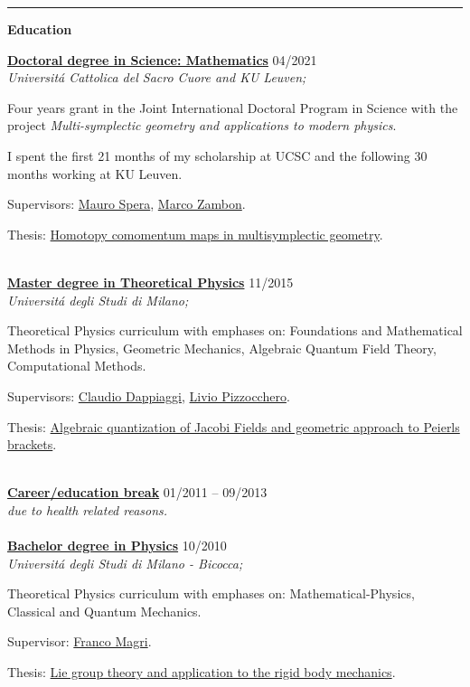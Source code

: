 \documentclass[a4paper]{article}
\newcommand{\block}[1]{\hrule \vspace{0.2cm} \textbf{\Large #1} \vspace{0.2cm}}
\newcommand{\voice}[5]{\href{#4}{\textbf{#1}} \hfill #2 \\ \textit{#3} \\ {\small #5} \vspace{0.2cm} \\}
\begin{document}
\begin{minipage}[t]{0.6\columnwidth}


    \block{Education}

    
    \voice{Doctoral degree in Science: Mathematics}
        {04/2021}
        {Universit\'a Cattolica del Sacro Cuore and KU Leuven;}
        {https://web.archive.org/save/http://scuoledidottorato.unicatt.it/phdschools/science-research-projects}       
        {Four years grant in the Joint International Doctoral Program in Science with the project \emph{Multi-symplectic geometry and applications to modern physics}. \par I spent the first 21 months of my scholarship at UCSC and the following 30 months working at KU Leuven. \par Supervisors: \href{http://docenti.unicatt.it/ita/mauro_spera/}{Mauro Spera}, \href{https://perswww.kuleuven.be/~u0096206/}{Marco Zambon}. \par Thesis: \href{https://limo.libis.be/primo-explore/fulldisplay?docid=LIRIAS3408626&context=L&vid=KULeuven&search_scope=ALL_CONTENT&tab=all_content_tab&lang=en_US}{Homotopy comomentum maps in multisymplectic geometry}.}
    \voice{Master degree in Theoretical Physics}
        {11/2015}
        {Universit\'a degli Studi di Milano;}
        {https://fisica-lm.cdl.unimi.it/it}       
        {Theoretical Physics curriculum with emphases on: Foundations and Mathematical Methods in Physics, Geometric Mechanics, Algebraic Quantum Field Theory, Computational Methods. \par Supervisors: \href{http://fisica.unipv.it/personale/Persona.php?ID=256}{Claudio Dappiaggi}, \href{http://users.mat.unimi.it/users/pizzocchero/}{Livio Pizzocchero}. \par Thesis: \href{https://www.researchgate.net/publication/295548746_Algebraic_quantization_of_Jacobi_fields_and_geometric_approach_to_Peierls_brackets}{Algebraic quantization of Jacobi Fields and geometric approach to Peierls brackets}.}
    \voice{Career/education break}
        {01/2011 -- 09/2013}
        {due to health related reasons.}
        {}       
        {\vspace{-0.25cm}}
    \voice{Bachelor degree in Physics}
        {10/2010}
        {Universit\'a degli Studi di Milano - Bicocca;}
        {https://www.fisica.unimib.it/en}       
        {Theoretical Physics curriculum with emphases on: Mathematical-Physics, Classical and Quantum Mechanics. \par Supervisor: \href{http://staff.matapp.unimib.it/~/magri/}{Franco Magri}. \par Thesis: \href{https://github.com/MasterToninus/TesiTriennale/blob/master/tesi.pdf}{Lie group theory and application to the rigid body mechanics}.}




\end{minipage} 
\end{document}
